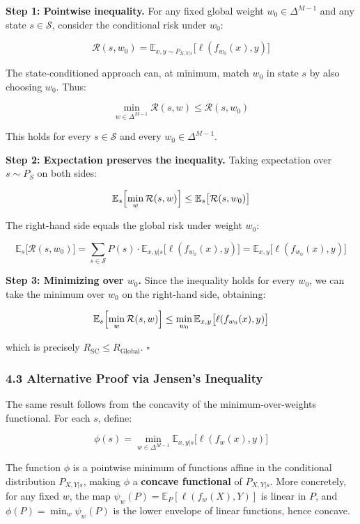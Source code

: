 \documentclass[
  12pt,
]{article}
\begin{document}
\textbf{Step 1: Pointwise inequality.} For any fixed global weight
\(w_0 \in \Delta^{M-1}\) and any state \(s \in \mathcal{S}\), consider
the conditional risk under \(w_0\):

\[\mathcal{R}(s, w_0) = \mathbb{E}_{x,y \sim P_{X,Y|s}}\bigl[\ell(f_{w_0}(x), y)\bigr]\]

The state-conditioned approach can, at minimum, match \(w_0\) in state
\(s\) by also choosing \(w_0\). Thus:

\[\min_{w \in \Delta^{M-1}} \mathcal{R}(s, w) \leq \mathcal{R}(s, w_0)\]

This holds for every \(s \in \mathcal{S}\) and every
\(w_0 \in \Delta^{M-1}\).

\textbf{Step 2: Expectation preserves the inequality.} Taking
expectation over \(s \sim P_S\) on both sides:

\[\mathbb{E}_s\Bigl[\min_{w} \mathcal{R}(s, w)\Bigr] \leq \mathbb{E}_s\bigl[\mathcal{R}(s, w_0)\bigr]\]

The right-hand side equals the global risk under weight \(w_0\):

\[\mathbb{E}_s\bigl[\mathcal{R}(s, w_0)\bigr] = \sum_{s \in \mathcal{S}} P(s) \cdot \mathbb{E}_{x,y|s}\bigl[\ell(f_{w_0}(x), y)\bigr] = \mathbb{E}_{x,y}\bigl[\ell(f_{w_0}(x), y)\bigr]\]

\textbf{Step 3: Minimizing over \(w_0\).} Since the inequality holds for
every \(w_0\), we can take the minimum over \(w_0\) on the right-hand
side, obtaining:

\[\mathbb{E}_s\Bigl[\min_{w} \mathcal{R}(s, w)\Bigr] \leq \min_{w_0} \mathbb{E}_{x,y}\bigl[\ell(f_{w_0}(x), y)\bigr]\]

which is precisely \(R_{\text{SC}} \leq R_{\text{Global}}\). \(\square\)

\subsubsection{4.3 Alternative Proof via Jensen's
Inequality}\label{alternative-proof-via-jensens-inequality}

The same result follows from the concavity of the minimum-over-weights
functional. For each \(s\), define:

\[\phi(s) = \min_{w \in \Delta^{M-1}} \mathbb{E}_{x,y|s}\bigl[\ell(f_w(x), y)\bigr]\]

The function \(\phi\) is a pointwise minimum of functions affine in the
conditional distribution \(P_{X,Y|s}\), making \(\phi\) a
\textbf{concave functional} of \(P_{X,Y|s}\). More concretely, for any
fixed \(w\), the map \(\psi_w(P) = \mathbb{E}_{P}[\ell(f_w(X), Y)]\) is
linear in \(P\), and \(\phi(P) = \min_w \psi_w(P)\) is the lower
envelope of linear functions, hence concave.
\end{document}
